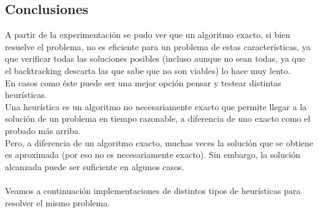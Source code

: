 \subsection{Conclusiones}

A partir de la experimentaci\'on se pudo ver que un algoritmo exacto, si bien resuelve el problema, no es eficiente para un problema de estas caracter\'isticas, ya que verificar todas las soluciones posibles (incluso aunque no sean todas, ya que el backtracking descarta las que sabe que no son viables) lo hace muy lento.\\
En casos como \'este puede ser una mejor opci\'on pensar y testear distintas heur\'isticas.\\

Una heur\'istica es un algoritmo no necesariamente exacto que permite llegar a la soluci\'on de un problema en tiempo razonable, a diferencia de uno exacto como el probado m\'as arriba.\\
Pero, a diferencia de un algoritmo exacto, muchas veces la soluci\'on que se obtiene es aproximada (por eso no es necesariamente exacto). Sin embargo, la soluci\'on alcanzada puede ser suficiente en algunos casos.\\\\

Veamos a continuaci\'on implementaciones de distintos tipos de heur\'isticas para resolver el mismo problema.\\